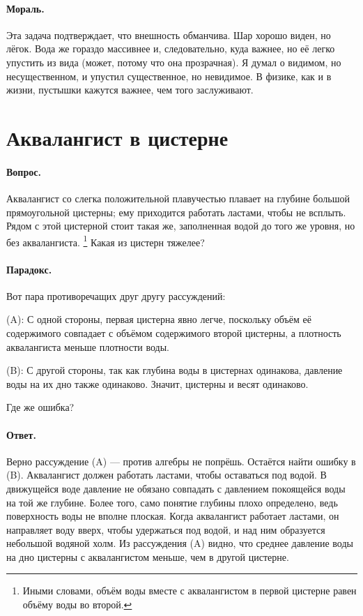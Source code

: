 \paragraph{Мораль.}
Эта задача подтверждает, что внешность обманчива.
Шар хорошо виден, но лёгок.
Вода же гораздо массивнее и, следовательно, куда важнее, но её легко упустить из вида (может, потому что она прозрачная).
Я думал о видимом, но несущественном, и упустил существенное, но невидимое.
В физике, как и в жизни, пустышки кажутся важнее, чем того заслуживают.

\section{Аквалангист в цистерне}

\paragraph{Вопрос.}
Аквалангист со слегка положительной плавучестью плавает на глубине большой прямоугольной цистерны; ему приходится работать ластами, чтобы не всплыть.
Рядом с этой цистерной стоит такая же, заполненная водой до того же уровня, но без аквалангиста.%
\footnote{Иными словами, объём воды вместе с аквалангистом в первой цистерне равен объёму воды во второй.}
Какая из цистерн тяжелее?

\paragraph{Парадокс.} Вот пара противоречащих друг другу рассуждений:

(A): С одной стороны, первая цистерна явно легче,
поскольку объём её содержимого совпадает с объёмом содержимого второй цистерны, а плотность аквалангиста меньше плотности воды.

(B): С другой стороны, так как глубина воды в цистернах одинакова, давление воды на их дно также одинаково.
Значит, цистерны и весят одинаково.

Где же ошибка?

\paragraph{Ответ.}
Верно рассуждение (A) --- против алгебры не попрёшь.
Остаётся найти ошибку в (B).
Аквалангист должен работать ластами, чтобы оставаться под водой.
В движущейся воде давление не обязано совпадать с давлением покоящейся воды на той же глубине.
Более того, само понятие глубины плохо определено, ведь поверхность воды не вполне плоская.
Когда аквалангист работает ластами, он направляет воду вверх, чтобы удержаться под водой,
и над ним образуется небольшой водяной холм.
Из рассуждения (A) видно, что среднее давление воды на дно цистерны с аквалангистом меньше, чем в другой цистерне.

